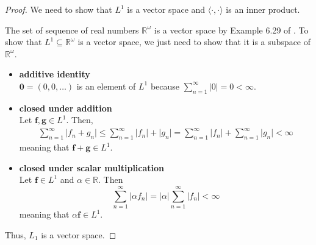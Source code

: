 \begin{proof}
    We need to show that $L^1$ is a vector space and $\langle \cdot, \cdot \rangle$ is an inner product.

    The set of sequence of real numbers $\mathbb{R}^{\omega}$ is a vector space by Example 6.29 of \cite{axler2020}.
    To show that $L^1 \subseteq \mathbb{R}^{\omega}$ is a vector space, we just need to show that it is a subspace of $\mathbb{R}^{\omega}$.
    \begin{itemize}
        \item \textbf{additive identity}\\
            $\mathbf{0} = (0, 0, \dots)$ is an element of $L^1$ because
            $\sum\limits_{n=1}^{\infty} \lvert 0 \rvert = 0 < \infty$.
        \item \textbf{closed under addition} \\
            Let $\mathbf{f}, \mathbf{g} \in L^1$.
            Then,
            \begin{align*}
                \sum\limits_{n=1}^{\infty} \lvert f_n + g_n \rvert
                \leq \sum\limits_{n=1}^{\infty} \lvert f_n \rvert + \lvert g_n \rvert
                = \sum\limits_{n=1}^{\infty} \lvert f_n \rvert + \sum\limits_{n=1}^{\infty} \lvert g_n \rvert
                < \infty
            \end{align*}
            meaning that $\mathbf{f} + \mathbf{g} \in L^1$.
        \item \textbf{closed under scalar multiplication} \\
            Let $\mathbf{f} \in L^1$ and $\alpha \in \mathbb{R}$.
            Then
            \begin{equation*}
                \sum\limits_{n=1}^{\infty} \lvert \alpha f_n \rvert
                = \lvert \alpha \rvert \sum\limits_{n=1}^{\infty} \lvert f_n \rvert
                < \infty
            \end{equation*}
            meaning that $\alpha \mathbf{f} \in L^1$.
    \end{itemize}
    Thus, $L_1$ is a vector space.


\end{proof}
